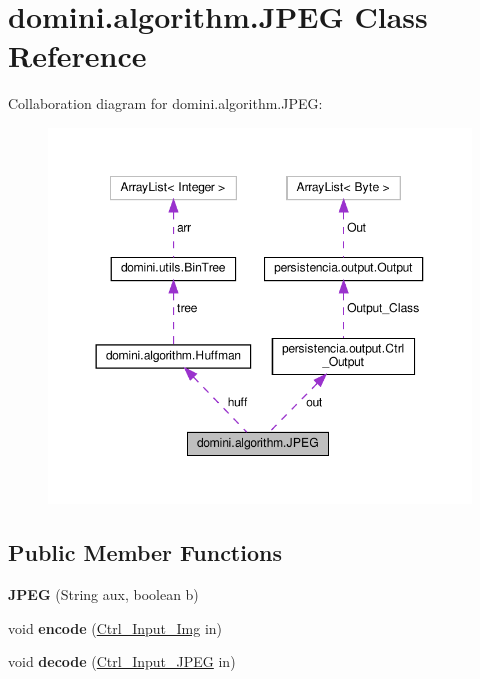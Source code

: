 \hypertarget{classdomini_1_1algorithm_1_1JPEG}{}\section{domini.\+algorithm.\+J\+P\+EG Class Reference}
\label{classdomini_1_1algorithm_1_1JPEG}


Collaboration diagram for domini.\+algorithm.\+J\+P\+EG\+:
\nopagebreak
\begin{figure}[H]
\begin{center}
\leavevmode
\includegraphics[width=350pt]{classdomini_1_1algorithm_1_1JPEG__coll__graph}
\end{center}
\end{figure}
\subsection*{Public Member Functions}
\begin{DoxyCompactItemize}
\item 
\mbox{\label{classdomini_1_1algorithm_1_1JPEG_a9dce5a80ccc8b626758cb4ae0b93e056}} 
{\bfseries J\+P\+EG} (String aux, boolean b)
\item 
\mbox{\label{classdomini_1_1algorithm_1_1JPEG_a4ba23333674aafc965dc90e077e4c2ab}} 
void {\bfseries encode} (\hyperlink{classpersistencia_1_1input_1_1Ctrl__Input__Img}{Ctrl\+\_\+\+Input\+\_\+\+Img} in)
\item 
\mbox{\label{classdomini_1_1algorithm_1_1JPEG_ada412451f1905760bb3d528aaa24e4cb}} 
void {\bfseries decode} (\hyperlink{classpersistencia_1_1input_1_1Ctrl__Input__JPEG}{Ctrl\+\_\+\+Input\+\_\+\+J\+P\+EG} in)
\end{DoxyCompactItemize}
